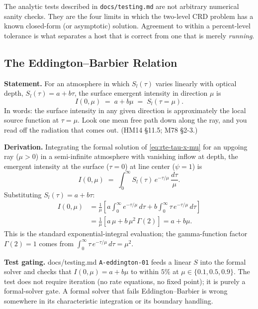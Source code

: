 \documentclass[11pt]{article}
\newcommand{\code}[1]{\texttt{#1}}
\begin{document}
The analytic tests described in \code{docs/testing.md} are not arbitrary numerical sanity checks.
They are the four limits in which the two-level CRD problem has a known
closed-form (or asymptotic) solution.  Agreement to within a percent-level
tolerance is what separates a host that is correct from one that is merely
\emph{running}.

\subsection{The Eddington--Barbier Relation}
\label{sec:eddington-barbier}

\textbf{Statement.} For an atmosphere in which $S_l(\tau)$ varies linearly
with optical depth, $S_l(\tau) = a + b\tau$, the surface emergent intensity
in direction $\mu$ is
\begin{equation}
I(0, \mu) \;=\; a + b\mu \;=\; S_l(\tau = \mu).
\label{eq:eddington-barbier}
\end{equation}
In words: the surface intensity in any given direction is approximately
the local source function at $\tau = \mu$.  Look one mean free path down
along the ray, and you read off the radiation that comes out.  (HM14
§11.5; M78 §2-3.)

\textbf{Derivation.} Integrating the formal solution of
\eqref{eq:rte-tau-x-mu} for an upgoing ray ($\mu > 0$) in a semi-infinite
atmosphere with vanishing inflow at depth, the emergent intensity at the
surface ($\tau = 0$) at line center ($\psi = 1$) is
\begin{equation}
I(0, \mu) \;=\; \int_0^{\infty} S_l(\tau)\, e^{-\tau/\mu}\, \frac{d\tau}{\mu}.
\label{eq:emergent-int}
\end{equation}
Substituting $S_l(\tau) = a + b\tau$:
\begin{align}
I(0, \mu)
&= \frac{1}{\mu}\!\left[ a\!\int_0^\infty\! e^{-\tau/\mu}\,d\tau + b\!\int_0^\infty\! \tau\, e^{-\tau/\mu}\,d\tau\right]\\
&= \frac{1}{\mu}\!\left[ a\,\mu + b\,\mu^2\,\Gamma(2) \right] = a + b\mu .
\end{align}
This is the standard exponential-integral evaluation; the gamma-function
factor $\Gamma(2) = 1$ comes from $\int_0^\infty \tau\, e^{-\tau/\mu}\,d\tau = \mu^2$.

\textbf{Test gating.} docs/testing.md \texttt{A-eddington-01} feeds a linear $S$
into the formal solver and checks that $I(0, \mu) = a + b\mu$ to within
$5\%$ at $\mu \in \{0.1, 0.5, 0.9\}$.  The test does not require iteration
(no rate equations, no fixed point); it is purely a formal-solver gate.
A formal solver that fails Eddington--Barbier is wrong somewhere in its
characteristic integration or its boundary handling.
\end{document}
